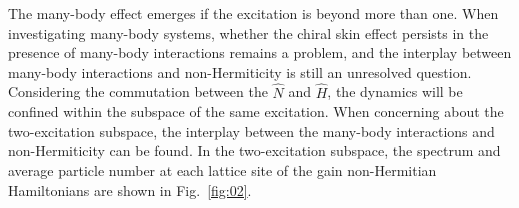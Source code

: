 \documentclass[longbibliography, aps, prx, amsmath, amssymb, amsfonts, twocolumn,superscriptaddress, footinbib]{revtex4-1}
\begin{document}
	
	The many-body effect emerges if the excitation is beyond more than one. 
	When investigating many-body systems, whether the chiral skin effect persists in the presence of many-body interactions remains a problem, and the interplay between many-body interactions and non-Hermiticity is still an unresolved question. 
	Considering the commutation between the $\hat{N}$ and $\hat{H}$, the dynamics will be confined within the subspace of the same excitation. When concerning about the two-excitation subspace, the interplay between the many-body interactions and non-Hermiticity can be found. 
	In the two-excitation subspace, the spectrum and average particle number at each lattice site of the gain non-Hermitian Hamiltonians 
	are shown in Fig.~\ref{fig:02}.

	
\end{document}
